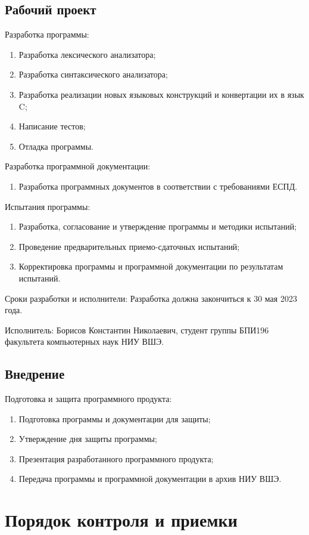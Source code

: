 \subsection{Рабочий проект}
Разработка программы:
\begin{enumerate}
  \item Разработка лексического анализатора;
  \item Разработка синтаксического анализатора;
  \item Разработка реализации новых языковых конструкций и конвертации их в язык C;
  \item Написание тестов;
  \item Отладка программы.
\end{enumerate}
Разработка программной документации:
\begin{enumerate}
  \item Разработка программных документов в соответствии с требованиями ЕСПД.
\end{enumerate}
Испытания программы:
\begin{enumerate}
  \item Разработка, согласование и утверждение программы и методики испытаний;
  \item Проведение предварительных приемо-сдаточных испытаний;
  \item Корректировка программы и программной документации по результатам испытаний.
\end{enumerate}
Сроки разработки и исполнители:
Разработка должна закончиться к 30 мая 2023 года.

Исполнитель: Борисов Константин Николаевич, студент группы БПИ196 факультета компьютерных наук НИУ ВШЭ.
\subsection{Внедрение}
Подготовка и защита программного продукта:
\begin{enumerate}
  \item Подготовка программы и документации для защиты;
  \item Утверждение дня защиты программы;
  \item Презентация разработанного программного продукта;
  \item Передача программы и программной документации в архив НИУ ВШЭ.
\end{enumerate}

\section{Порядок контроля и приемки}

